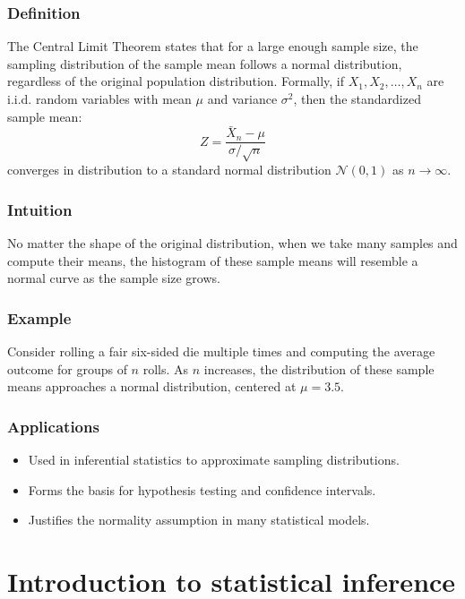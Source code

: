 \documentclass{book}
\begin{document}
\subsection{Definition}
The Central Limit Theorem states that for a large enough sample size, the sampling distribution of the sample mean follows a normal distribution, regardless of the original population distribution. Formally, if $X_1, X_2, \dots, X_n$ are i.i.d. random variables with mean $\mu$ and variance $\sigma^2$, then the standardized sample mean:
\begin{equation}
    Z = \frac{\bar{X}_n - \mu}{\sigma / \sqrt{n}}
\end{equation}
converges in distribution to a standard normal distribution $\mathcal{N}(0,1)$ as $n \to \infty$.

\subsection{Intuition}
No matter the shape of the original distribution, when we take many samples and compute their means, the histogram of these sample means will resemble a normal curve as the sample size grows.

\subsection{Example}
Consider rolling a fair six-sided die multiple times and computing the average outcome for groups of $n$ rolls. As $n$ increases, the distribution of these sample means approaches a normal distribution, centered at $\mu=3.5$.

\subsection{Applications}
\begin{itemize}
    \item Used in inferential statistics to approximate sampling distributions.
    \item Forms the basis for hypothesis testing and confidence intervals.
    \item Justifies the normality assumption in many statistical models.
\end{itemize}

\chapter{Introduction to statistical inference}
\end{document}

